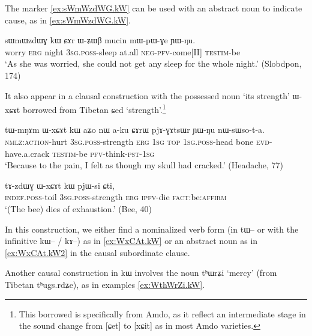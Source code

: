 \documentclass[oldfontcommands,oneside,a4paper,11pt]{article}
\newcommand{\ipa}[1]{{\phon #1}} %
\begin{document}
The marker \ref{ex:sWmWzdWG.kW} can be used with an abstract noun to indicate cause, as in \ref{ex:sWmWzdWG.kW}.

\begin{exe}
\ex \label{ex:sWmWzdWG.kW}
\gll 
\ipa{sɯmɯzdɯɣ}  	\ipa{kɯ}  	\ipa{ɕɤr}  	\ipa{ɯ-ʑɯβ}  	\ipa{mucin}  	\ipa{mɯ-pɯ-ɣe}  	\ipa{ɲɯ-ŋu.}  	 \\
worry \textsc{erg} night \textsc{3sg.poss}-sleep at.all \textsc{neg-pfv}-come[II] \textsc{testim}-be \\
\glt `As she was worried, she could not get any sleep for the whole night.' (Slobdpon, 174)
\end{exe}


  It also appear in a clausal construction with the possessed noun `its strength' \ipa{ɯ-xɕɤt} borrowed from Tibetan \ipa{ɕed} `strength'.\footnote{This borrowed is specifically from Amdo, as it reflect an intermediate stage in the sound change from [ɕet] to [xɕit] as in most Amdo varieties.}

 

\begin{exe}
\ex \label{ex:WxCAt.kW}
\gll
\ipa{tɯ-mŋɤm} 	\ipa{ɯ-xɕɤt} 	\ipa{kɯ} 	\ipa{aʑo} 	\ipa{nɯ} 	\ipa{a-ku} 	\ipa{ɕɤrɯ} 	\ipa{pjɤ-ɣɤtsɯr} 	\ipa{ɲɯ-ŋu} 	\ipa{nɯ-sɯso-t-a.} 	\\
\textsc{nmlz:action}-hurt \textsc{3sg.poss}-strength \textsc{erg} \textsc{1sg} \textsc{top} \textsc{1sg.poss}-head bone \textsc{evd}-have.a.crack \textsc{testim}-be \textsc{pfv}-think-\textsc{pst-1sg} \\
\glt `Because to the pain, I felt as though my skull had cracked.' (Headache, 77)
  \end{exe}

  \begin{exe}
\ex \label{ex:WxCAt.kW2}
\gll
  \ipa{tɤ-zdɯɣ} 	\ipa{ɯ-xɕɤt} 	\ipa{kɯ} 	\ipa{pjɯ-si} 	\ipa{ɕti,} \\
  \textsc{indef.poss}-toil  \textsc{3sg.poss}-strength \textsc{erg} \textsc{ipfv}-die \textsc{fact}:be:\textsc{affirm} \\
 \glt `(The bee) dies of exhaustion.' (Bee, 40)
  \end{exe}
  
In this construction, we either find a nominalized verb form (in \ipa{tɯ--} or with the infinitive \ipa{kɯ--} / \ipa{kɤ--}) as in \ref{ex:WxCAt.kW} or an abstract noun as in \ref{ex:WxCAt.kW2} in the causal subordinate clause.

Another causal construction in \ipa{kɯ} involves the noun \ipa{tʰɯrʑi} `mercy' (from Tibetan \ipa{tʰugs.rdʑe}), as in examples \ref{ex:WthWrZi.kW}.
\end{document}
